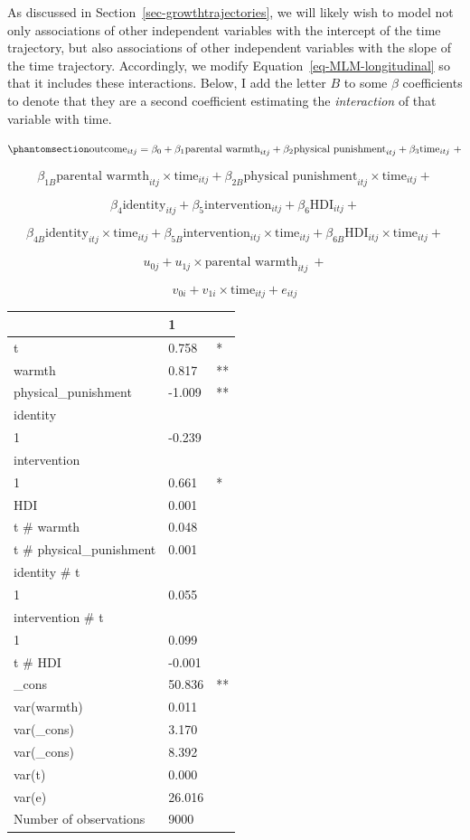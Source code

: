 \documentclass[
  letterpaper,
  DIV=11,
  numbers=noendperiod]{scrreprt}
\begin{document}
As discussed in Section~\ref{sec-growthtrajectories}, we will likely
wish to model not only associations of other independent variables with
the intercept of the time trajectory, but also associations of other
independent variables with the slope of the time trajectory.
Accordingly, we modify Equation~\ref{eq-MLM-longitudinal} so that it
includes these interactions. Below, I add the letter \(B\) to some
\(\beta\) coefficients to denote that they are a second coefficient
estimating the \emph{interaction} of that variable with time.

\begin{equation}\phantomsection\label{eq-MLM-longitudinal}{\text{outcome}_{itj} = \beta_0 + \beta_1 \text{parental warmth}_{itj} + \beta_2 \text{physical punishment}_{itj} + \beta_3 \text{time}_{itj} \ + }\end{equation}

\[\beta_{1B} \text{parental warmth}_{itj} \times \text{time}_{itj} + \beta_{2B} \text{physical punishment}_{itj} \times \text{time}_{itj} +\]

\[\beta_4 \text{identity}_{itj} + \beta_5 \text{intervention}_{itj} + \beta_6 \text{HDI}_{itj} +\]

\[\beta_{4B} \text{identity}_{itj} \times \text{time}_{itj} + \beta_{5B} \text{intervention}_{itj} \times \text{time}_{itj} + \beta_{6B} \text{HDI}_{itj} \times \text{time}_{itj} +\]

\[u_{0j} + u_{1j} \times \text{parental warmth}_{itj} \ + \]

\[v_{0i} + v_{1i} \times \text{time}_{itj} + e_{itj}\]

\begin{longtable}[]{@{}lll@{}}
\toprule\noalign{}
& 1 & \\
\midrule\noalign{}
\endhead
\bottomrule\noalign{}
\endlastfoot
t & 0.758 & * \\
warmth & 0.817 & ** \\
physical\_punishment & -1.009 & ** \\
identity & & \\
1 & -0.239 & \\
intervention & & \\
1 & 0.661 & * \\
HDI & 0.001 & \\
t \# warmth & 0.048 & \\
t \# physical\_punishment & 0.001 & \\
identity \# t & & \\
1 & 0.055 & \\
intervention \# t & & \\
1 & 0.099 & \\
t \# HDI & -0.001 & \\
\_cons & 50.836 & ** \\
var(warmth) & 0.011 & \\
var(\_cons) & 3.170 & \\
var(\_cons) & 8.392 & \\
var(t) & 0.000 & \\
var(e) & 26.016 & \\
Number of observations & 9000 & \\
\end{longtable}
\end{document}
